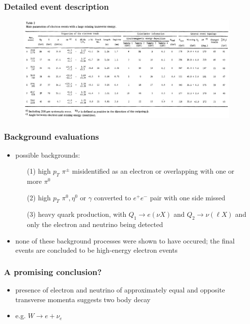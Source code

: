 \documentclass[xcolor=table]{beamer}
\begin{document}
\begin{frame}
\frametitle{Detailed event description}
\fontsize{12pt}{12}\selectfont

\begin{figure}[h]
\centering
\includegraphics[width=\textwidth]{images/event-information.png}
\end{figure}


\end{frame}



\begin{frame}
\frametitle{Background evaluations}
\fontsize{11pt}{12}\selectfont

\begin{itemize}
\item possible backgrounds:
\begin{enumerate}
\item[(1)] high $p_T$ $\pi^{\pm}$ misidentified as an electron or overlapping with one or more $\pi^0$
\item[(2)] high $p_T$ $\pi^0,\eta^0$ or $\gamma$ converted to $e^+ e^-$ pair with one side missed
\item[(3)] heavy quark production, with $Q_1\to e(\nu X)$ and $Q_2\to \nu(\ell X)$ and only the electron and neutrino being detected
\end{enumerate}
\item none of these background processes were shown to have occured; the final events are concluded to be high-energy electron events
\end{itemize}


\end{frame}


\begin{frame}
\frametitle{A promising conclusion?}
\fontsize{12pt}{12}\selectfont

\begin{itemize}
\item presence of electron and neutrino of approximately equal and opposite transverse momenta suggests two body decay
\item[]
\item e.g. $W\to e+\nu_e$
\end{itemize}


\end{frame}
\end{document}
